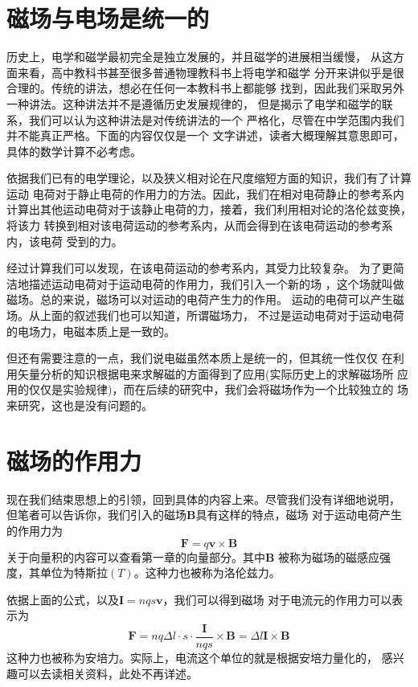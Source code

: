 \section{磁场与电场是统一的}
历史上，电学和磁学最初完全是独立发展的，并且磁学的进展相当缓慢，
从这方面来看，高中教科书甚至很多普通物理教科书上将电学和磁学
分开来讲似乎是很合理的。传统的讲法，想必在任何一本教科书上都能够
找到，因此我们采取另外一种讲法。这种讲法并不是遵循历史发展规律的，
但是揭示了电学和磁学的联系，我们可以认为这种讲法是对传统讲法的一个
严格化，尽管在中学范围内我们并不能真正严格。下面的内容仅仅是一个
文字讲述，读者大概理解其意思即可，具体的数学计算不必考虑。

依据我们已有的电学理论，以及狭义相对论在尺度缩短方面的知识，我们有了计算运动
电荷对于静止电荷的作用力的方法。因此，我们在相对电荷静止的参考系内
计算出其他运动电荷对于该静止电荷的力，接着，我们利用相对论的洛伦兹变换，将该力
转换到相对该电荷运动的参考系内，从而会得到在该电荷运动的参考系内，该电荷
受到的力。

经过计算我们可以发现，在该电荷运动的参考系内，其受力比较复杂。
为了更简洁地描述运动电荷对于运动电荷的作用力，我们引入一个新的场
，这个场就叫做磁场。总的来说，磁场可以对运动的电荷产生力的作用。
运动的电荷可以产生磁场。从上面的叙述我们也可以知道，所谓磁场力，
不过是运动电荷对于运动电荷的电场力，电磁本质上是一致的。

但还有需要注意的一点，我们说电磁虽然本质上是统一的，但其统一性仅仅
在利用矢量分析的知识根据电来求解磁的方面得到了应用(实际历史上的求解磁场所
应用的仅仅是实验规律)，而在后续的研究中，我们会将磁场作为一个比较独立的
场来研究，这也是没有问题的。

\section{磁场的作用力}
现在我们结束思想上的引领，回到具体的内容上来。尽管我们没有详细地说明，
但笔者可以告诉你，我们引入的磁场$\boldsymbol{B}$具有这样的特点，磁场
对于运动电荷产生的作用力为 
\begin{equation}
    \boldsymbol{F}=q\boldsymbol{v}\times \boldsymbol{B}
\end{equation}
关于向量积的内容可以查看第一章的向量部分。其中$\boldsymbol{B}$
被称为磁场的磁感应强度，其单位为特斯拉$(T)$。这种力也被称为洛伦兹力。

依据上面的公式，以及$\boldsymbol{I}=nqs\boldsymbol{v}$，我们可以得到磁场
对于电流元的作用力可以表示为
\begin{equation}
    \boldsymbol{F}=nq\Delta l\cdot s\cdot \frac{\boldsymbol{I}}{nqs}\times \boldsymbol{B}
    =\Delta l\boldsymbol{I}\times \boldsymbol{B}
\end{equation}
这种力也被称为安培力。实际上，电流这个单位的就是根据安培力量化的，
感兴趣可以去读相关资料，此处不再详述。
